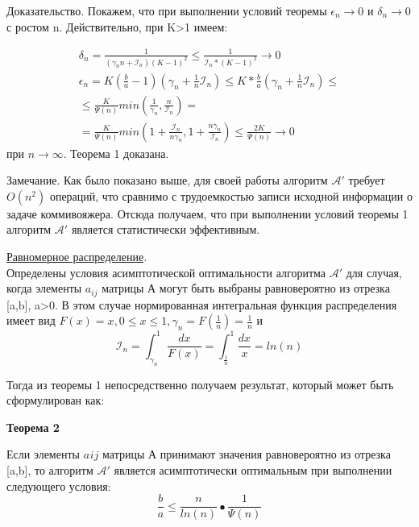 \documentclass[a4paper, 14pt]{extarticle}
\begin{document}
Доказательство. Покажем, что при выполнении условий теоремы $\epsilon_n \to 0$ и $\delta_n \to 0$ с ростом n. Действительно, при K>1 имеем:

\begin{equation}
\begin{aligned}
\delta_n = \frac{1}{(\gamma_n n+\mathcal{I}_n)(K-1)^2} \leq \frac{1}{\mathcal{I}_n * (K-1)^2} \to 0 \\
\epsilon_n = K(\frac{b}{a}-1)(\gamma_n+\frac{1}{n} \mathcal{I}_n) \leq K*\frac{b}{a} (\gamma_n+\frac{1}{n} \mathcal{I}_n)\leq \\
\leq \frac{K}{\Psi(n)} min(\frac{1}{\gamma_n}, \frac{n}{\mathcal{I}_n}) = \\
= \frac{K}{\Psi(n)} min (1+\frac{\mathcal{I}_n}{n \gamma_n}, 1+\frac{n \gamma_n}{\mathcal{I}_n}) \leq \frac{2K}{\Psi(n)} \to 0
\end{aligned}
\end{equation}
при $n \to \infty$. Теорема 1 доказана.

Замечание. Как было показано выше, для своей работы алгоритм $\mathcal{A'}$ требует $O(n^2)$ операций, что сравнимо с трудоемкостью записи исходной информации о задаче коммивояжера. Отсюда получаем, что при выполнении условий теоремы 1 алгоритм $\mathcal{A'}$ является статистически эффективным.


\underline{Равномерное распределение}.\\ 
Определены условия асимптотической оптимальности алгоритма $\mathcal{A'}$ для случая, когда элементы $a_{ij}$ матрицы А могут быть выбраны равновероятно из отрезка [a,b], a>0. В этом случае нормированная интегральная функция распределения имеет вид $F(x) = x, 0 \leq x \leq 1, \gamma_n = F(\frac{1}{n}) = \frac{1}{n}$ и
\begin{equation}
\mathcal{I}_n = \int_{\gamma_n}^1 \frac{dx}{F(x)} = \int_{\frac{1}{n}}^1 \frac{dx}{x} = ln(n)
\end{equation}

Тогда из теоремы 1 непосредственно получаем результат, который может быть сформулирован как:

\textbf{Теорема 2} 

Если элементы $a_{}ij$ матрицы А принимают значения равновероятно из отрезка [a,b], то алгоритм $\mathcal{A'}$ является асимптотически оптимальным при выполнении следующего условия:
\begin{equation}
\frac{b}{a} \leq \frac{n}{ln(n)}•\frac{1}{\Psi(n)}
\end{equation}
\end{document}
